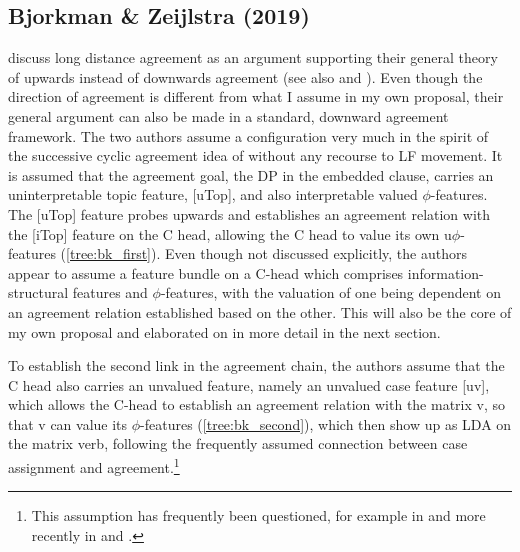 \documentclass[output=paper
,modfonts
,nonflat]{langsci/langscibook}
\begin{document}
\subsection{Bjorkman \& Zeijlstra (2019)}

\citet{Bjorkman_Zeijlstra2014} discuss long distance agreement as an argument supporting their general theory of upwards instead of downwards agreement (see also \citealt{Baker2008a} and \citealt{Wurmbrand2012c,Wurmbrand2016a,Wurmbrand2016b}). Even though the direction of agreement is different from what I assume in my own proposal, their general argument can also be made in a standard, downward agreement framework. The two authors assume a configuration very much in the spirit of the successive cyclic agreement idea of \citet{Legate2005} without any recourse to LF movement. It is assumed that the agreement goal, the DP in the embedded clause, carries an uninterpretable topic feature, [uTop], and also interpretable valued $ \phi $-features. The [uTop] feature probes upwards and establishes an agreement relation with the [iTop] feature on the C head, allowing the C head to value its own u$ \phi $-features (\ref{tree:bk_first}). Even though not discussed explicitly, the authors appear to assume a feature bundle on a C-head which comprises information-structural features and $ \phi $-features, with the valuation of one being dependent on an agreement relation established based on the other. This will also be the core of my own proposal and elaborated on in more detail in the next section.

To establish the second link in the agreement chain, the authors assume that the C head also carries an unvalued feature, namely an unvalued case feature [uv], which allows the C-head to establish an agreement relation with the matrix v, so that v can value its $ \phi $-features (\ref{tree:bk_second}), which then show up as LDA on the matrix verb, following the frequently assumed connection between case assignment and agreement.\footnote{This assumption has frequently been questioned, for example in \citet{Bobaljik2008} and more recently in \citet{Baker_Bobaljik2015} and \cite{Barany2015}.}
\end{document}
